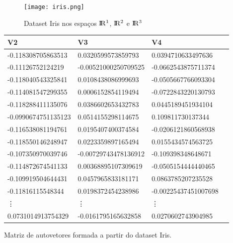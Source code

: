 \documentclass{article}
\begin{document}
        \begin{figure}
            \begin{center}
                \texttt{[image: iris.png]}
            \end{center}
            \caption{Dataset Iris nos espaços $\rm I\!R^{1}$, $\rm I\!R^{2}$ e $\rm I\!R^{3}$}
        \end{figure}

        \begin{center}
            \begin{tabular}{llll}
                V2         & V3         & V4         \\
                \hline
                -0.118308705863513 & 0.0320599573859793 & 0.0394710633497636 \\
                -0.11126752124219 & -0.00521000250709525 & -0.0662543875711374 \\
                -0.118040543325841 & 0.0108438086999693 & -0.0505667766093304 \\
                -0.114081547299355 & 0.0006152854119494 & -0.0722843220130793 \\
                -0.118288411135076 & 0.0386602653432783 & 0.0445189451934104 \\
                -0.0990674751135123 & 0.0514155298114675 & 0.109811730137344 \\
                -0.116538081194761 & 0.0195407400374584 & -0.0206121860568938 \\
                -0.118550146248947 & 0.0223359897165494 & 0.0155434574563725 \\
                -0.107350970039746 & -0.00729743478136912 & -0.109398348648671 \\
                -0.114872674541133 & 0.00368895107309619 & -0.0505154444440465 \\
                -0.109919504644431 & 0.0457965833181171 & 0.0863785207235528 \\
                -0.11816115548344 & 0.0198372454238986 & -0.00225437451007698 \\
                \vdots & \vdots & \vdots \\
                0.0731014913754329 & -0.0161795165632858 & 0.0270602743904985
            \end{tabular}\par
            Matriz de autovetores formada a partir do dataset Iris.
        \end{center}
\end{document}
